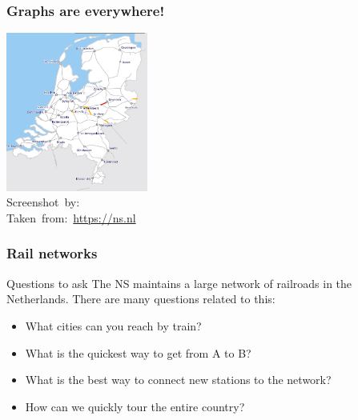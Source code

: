 \begin{frame}
	\frametitle{Graphs are everywhere!}
	
	\begin{center}
		\includegraphics[width=0.35\textwidth]{images/ns.png}\\
		\hspace*{15pt}\hbox{\scriptsize Screenshot by: }\\
		\hspace*{15pt}\hbox{\scriptsize Taken from: \url{https://ns.nl}}
	\end{center}
\end{frame}

\begin{frame}
	\frametitle{Rail networks}
	
	\begin{overlayarea}{\textwidth}{\textheight}
			\begin{block}{Questions to ask}
				The NS maintains a large network of railroads in the Netherlands. There are many questions related to this:
				\begin{itemize}
					\item \alert<5>{What cities can you reach by train?}
						\pause
					\item \alert<6>{What is the quickest way to get from A to B?}
						\pause
					\item \alert<7>{What is the best way to connect new stations to the network?}
						\pause
					\item \alert<8>{How can we quickly tour the entire country?}
				\end{itemize}
			\end{block}
	\end{overlayarea}
\end{frame}


